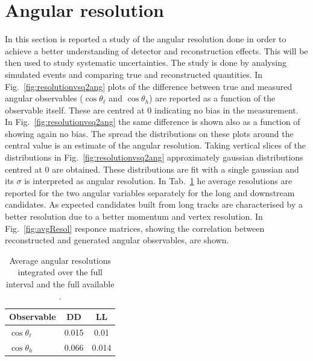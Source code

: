 \section{Angular resolution}
\label{sec:and_resolution}

In this section is reported a study of the angular resolution done in order to achieve a better understanding
of detector and reconstruction effects. This will be then used to study systematic uncertainties.
The study is done by analysing simulated events and comparing true and reconstructed quantities.
In Fig.~\ref{fig:resolutionvsq2ang} plots of the difference between true and measured angular observables 
($\cos \theta_\ell$ and $\cos \theta_h$)  are reported as a function of the observable itself.
These are centred at 0 indicating no bias in the measurement.
In Fig.~\ref{fig:resolutionvsq2ang} the same difference is shown also as a function of \qsq showing again no bias.
The spread the distributions on these plots around the central value is an estimate of the angular resolution.
Taking vertical slices of the distributions in Fig.~\ref{fig:resolutionvsq2ang} approximately gaussian
distributions centred at 0 are obtained. These distributions are fit with a single gaussian and its $\sigma$
is interpreted as angular resolution. In Tab.~\ref{tab:resolutions} he average resolutions are reported
for the two angular variables separately for the long and downstream candidates. As expected candidates built
from long tracks are characterised by a better resolution due to a better momentum and vertex resolution.
In Fig.~\ref{fig:avgResol} responce matrices, showing the correlation between reconstructed and
generated angular observables, are shown.

\begin{table}[b]
\centering
\caption{Average angular resolutions integrated over the full interval and the full available \qsq.}
\begin{tabular}{l|cc}
Observable      & DD & LL     \\ \hline
$\cos \theta_\ell$ & 0.015 & 0.01 \\
$\cos \theta_h$ & 0.066 & 0.014 \\
\end{tabular}
\label{tab:resolutions}
\end{table}



